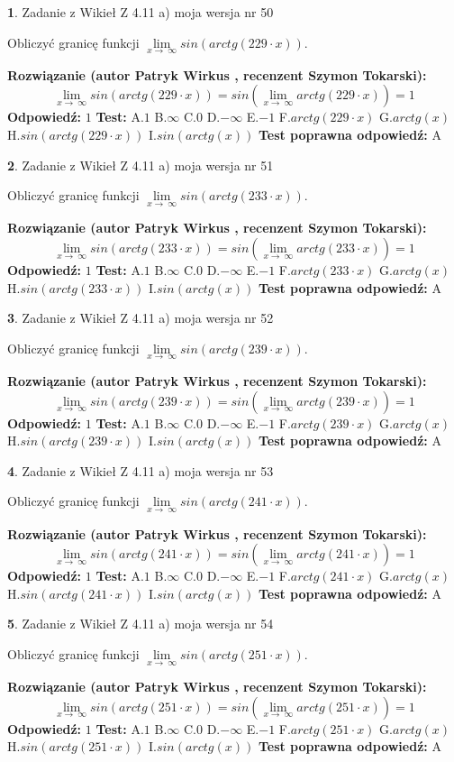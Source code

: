 \documentclass[12pt, a4paper]{article}
\theoremstyle{definition} %
\newtheorem{zad}{}
\newcommand{\zadStart}[1]{\begin{zad}#1\newline}
\newcommand{\zadStop}{\end{zad}}
\newcommand{\rozwStart}[2]{\noindent \textbf{Rozwiązanie (autor #1 , recenzent #2): }\newline}
\newcommand{\rozwStop}{\newline}
\newcommand{\odpStart}{\noindent \textbf{Odpowiedź:}\newline}
\newcommand{\odpStop}{\newline}
\newcommand{\testStart}{\noindent \textbf{Test:}\newline}
\newcommand{\testStop}{\newline}
\newcommand{\kluczStart}{\noindent \textbf{Test poprawna odpowiedź:}\newline}
\newcommand{\kluczStop}{\newline}
\begin{document}
\zadStart{Zadanie z Wikieł Z 4.11 a) moja wersja nr 50}

Obliczyć granicę funkcji  $\lim\limits_{x\to\ \infty}sin(arctg(229\cdot x))$.
\zadStop
\rozwStart{Patryk Wirkus}{Szymon Tokarski}
$$\lim\limits_{x\to\ \infty}sin(arctg(229\cdot x)) = sin(\lim\limits_{x\to\ \infty}arctg(229\cdot x)) = 1$$
\rozwStop
\odpStart
$1$
\odpStop
\testStart
A.$1$ B.$\infty$ C.$0$ D.$-\infty$ E.$-1$
F.$arctg(229\cdot x)$ G.$arctg(x)$
H.$sin(arctg(229\cdot x))$
I.$sin(arctg(x))$
\testStop
\kluczStart
A
\kluczStop



\zadStart{Zadanie z Wikieł Z 4.11 a) moja wersja nr 51}

Obliczyć granicę funkcji  $\lim\limits_{x\to\ \infty}sin(arctg(233\cdot x))$.
\zadStop
\rozwStart{Patryk Wirkus}{Szymon Tokarski}
$$\lim\limits_{x\to\ \infty}sin(arctg(233\cdot x)) = sin(\lim\limits_{x\to\ \infty}arctg(233\cdot x)) = 1$$
\rozwStop
\odpStart
$1$
\odpStop
\testStart
A.$1$ B.$\infty$ C.$0$ D.$-\infty$ E.$-1$
F.$arctg(233\cdot x)$ G.$arctg(x)$
H.$sin(arctg(233\cdot x))$
I.$sin(arctg(x))$
\testStop
\kluczStart
A
\kluczStop



\zadStart{Zadanie z Wikieł Z 4.11 a) moja wersja nr 52}

Obliczyć granicę funkcji  $\lim\limits_{x\to\ \infty}sin(arctg(239\cdot x))$.
\zadStop
\rozwStart{Patryk Wirkus}{Szymon Tokarski}
$$\lim\limits_{x\to\ \infty}sin(arctg(239\cdot x)) = sin(\lim\limits_{x\to\ \infty}arctg(239\cdot x)) = 1$$
\rozwStop
\odpStart
$1$
\odpStop
\testStart
A.$1$ B.$\infty$ C.$0$ D.$-\infty$ E.$-1$
F.$arctg(239\cdot x)$ G.$arctg(x)$
H.$sin(arctg(239\cdot x))$
I.$sin(arctg(x))$
\testStop
\kluczStart
A
\kluczStop



\zadStart{Zadanie z Wikieł Z 4.11 a) moja wersja nr 53}

Obliczyć granicę funkcji  $\lim\limits_{x\to\ \infty}sin(arctg(241\cdot x))$.
\zadStop
\rozwStart{Patryk Wirkus}{Szymon Tokarski}
$$\lim\limits_{x\to\ \infty}sin(arctg(241\cdot x)) = sin(\lim\limits_{x\to\ \infty}arctg(241\cdot x)) = 1$$
\rozwStop
\odpStart
$1$
\odpStop
\testStart
A.$1$ B.$\infty$ C.$0$ D.$-\infty$ E.$-1$
F.$arctg(241\cdot x)$ G.$arctg(x)$
H.$sin(arctg(241\cdot x))$
I.$sin(arctg(x))$
\testStop
\kluczStart
A
\kluczStop



\zadStart{Zadanie z Wikieł Z 4.11 a) moja wersja nr 54}

Obliczyć granicę funkcji  $\lim\limits_{x\to\ \infty}sin(arctg(251\cdot x))$.
\zadStop
\rozwStart{Patryk Wirkus}{Szymon Tokarski}
$$\lim\limits_{x\to\ \infty}sin(arctg(251\cdot x)) = sin(\lim\limits_{x\to\ \infty}arctg(251\cdot x)) = 1$$
\rozwStop
\odpStart
$1$
\odpStop
\testStart
A.$1$ B.$\infty$ C.$0$ D.$-\infty$ E.$-1$
F.$arctg(251\cdot x)$ G.$arctg(x)$
H.$sin(arctg(251\cdot x))$
I.$sin(arctg(x))$
\testStop
\kluczStart
A
\kluczStop
\end{document}
